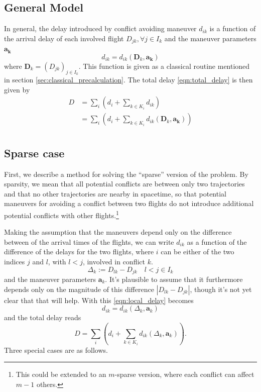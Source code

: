 \documentclass{article}
\begin{document}
\subsection{General Model}
In general, the delay introduced by conflict avoiding maneuver $d_{ik}$ is a
function of the arrival delay of each involved flight $D_{jk}, \forall j \in
I_k$ and the maneuver parameters $\mathbf{a_k}$ \begin{equation}
  \label{eqn:local_delay}
  d_{ik} = d_{ik}(\mathbf D_{k}, \mathbf{a_k}) 
\end{equation}
where $\mathbf D_k = (D_{jk})_{j \in I_k}$.
This function is given as a classical routine mentioned in section \ref{sec:classical_precalculation}.
The total delay \eqref{eqn:total_delay} is then given by
\begin{align*}
  D &= \sum_i \left(d_i + \sum_{k\in K_i} d_{ik}\right) \\
  &= \sum_i \left(d_i + \sum_{k\in K_i} d_{ik}(\mathbf D_{k}, \mathbf{a_k})\right) \\
\end{align*}

\subsection{Sparse case}
First, we describe a method for solving the ``sparse'' version of the problem.
By sparsity, we mean that all potential conflicts are between only two
trajectories and that no other trajectories are nearby in spacetime, so that
potential maneuvers for avoiding a conflict between two flights do not
introduce additional potential conflicts with other flights.\footnote{This
  could be extended to an $m$-sparse version, where each conflict can affect
$m-1$ others.}

Making the assumption that the maneuvers depend only on the difference
between of the arrival times of the flights, 
we can write $d_{ik}$ as a function of the difference of the delays 
for the two flights, where $i$ can be either of the two indices $j$ and $l$, 
with $l<j$, involved in conflict $k$.
\begin{equation*}
  \Delta_{k} := D_{lk} - D_{jk} \quad l < j \in I_k
\end{equation*}
and the maneuver parameters $\mathbf{a}_k$.
It's plausible to assume that it furthermore depends only on the magnitude of this difference $|D_{lk} - D_{jk}|$, though it's not yet clear that that will help.
With this \eqref{eqn:local_delay} becomes
\begin{equation*}
  d_{ik} = d_{ik}(\Delta_{k}, \mathbf{a}_k) 
\end{equation*}
and the total delay reads
\begin{equation*}
  D = \sum_i \left(d_i + \sum_{k\in K_i} d_{ik} (\Delta_k, \mathbf{a}_k)\right).
\end{equation*}
Three special cases are as follows. 
\end{document}
